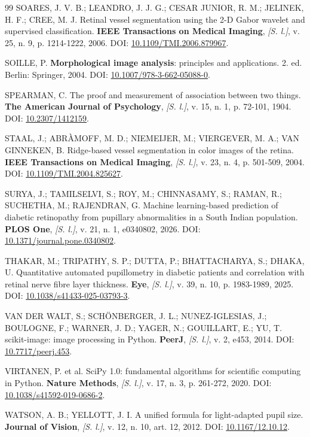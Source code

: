 \documentclass[12pt, oneside, a4paper, chapter=TITLE, section=TITLE,
               english, brazil]{abntex2}
\newcommand{\doi}[1]{DOI: \href{https://doi.org/#1}{#1}}
\newcommand{\semlocal}{\textit{[S. l.]}}
\begin{document}
\begin{thebibliography}{99}
SOARES, J. V. B.; LEANDRO, J. J. G.; CESAR JUNIOR, R. M.; JELINEK, H. F.;
CREE, M. J. Retinal vessel segmentation using the 2-D Gabor wavelet and
supervised classification. \textbf{IEEE Transactions on Medical Imaging},
\semlocal, v. 25, n. 9, p. 1214-1222, 2006. \doi{10.1109/TMI.2006.879967}.

SOILLE, P. \textbf{Morphological image analysis}: principles and
applications. 2. ed. Berlin: Springer, 2004.
\doi{10.1007/978-3-662-05088-0}.

SPEARMAN, C. The proof and measurement of association between two things.
\textbf{The American Journal of Psychology}, \semlocal, v. 15, n. 1,
p. 72-101, 1904. \doi{10.2307/1412159}.

STAAL, J.; ABRÀMOFF, M. D.; NIEMEIJER, M.; VIERGEVER, M. A.; VAN GINNEKEN, B.
Ridge-based vessel segmentation in color images of the retina. \textbf{IEEE
Transactions on Medical Imaging}, \semlocal, v. 23, n. 4, p. 501-509, 2004.
\doi{10.1109/TMI.2004.825627}.

SURYA, J.; TAMILSELVI, S.; ROY, M.; CHINNASAMY, S.; RAMAN, R.; SUCHETHA, M.;
RAJENDRAN, G. Machine learning-based prediction of diabetic retinopathy from
pupillary abnormalities in a South Indian population. \textbf{PLOS One},
\semlocal, v. 21, n. 1, e0340802, 2026. \doi{10.1371/journal.pone.0340802}.

THAKAR, M.; TRIPATHY, S. P.; DUTTA, P.; BHATTACHARYA, S.; DHAKA, U.
Quantitative automated pupillometry in diabetic patients and correlation with
retinal nerve fibre layer thickness. \textbf{Eye}, \semlocal, v. 39, n. 10,
p. 1983-1989, 2025. \doi{10.1038/s41433-025-03793-3}.

VAN DER WALT, S.; SCHÖNBERGER, J. L.; NUNEZ-IGLESIAS, J.; BOULOGNE, F.;
WARNER, J. D.; YAGER, N.; GOUILLART, E.; YU, T. scikit-image: image
processing in Python. \textbf{PeerJ}, \semlocal, v. 2, e453, 2014.
\doi{10.7717/peerj.453}.

VIRTANEN, P. et al. SciPy 1.0: fundamental algorithms for scientific
computing in Python. \textbf{Nature Methods}, \semlocal, v. 17, n. 3,
p. 261-272, 2020. \doi{10.1038/s41592-019-0686-2}.

WATSON, A. B.; YELLOTT, J. I. A unified formula for light-adapted pupil size.
\textbf{Journal of Vision}, \semlocal, v. 12, n. 10, art. 12, 2012.
\doi{10.1167/12.10.12}.


\end{thebibliography}
\end{document}
